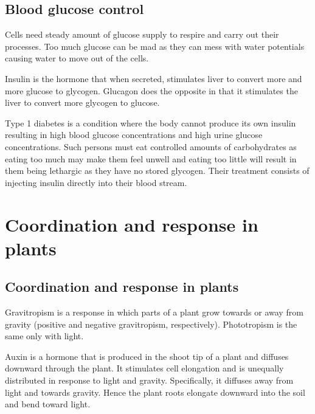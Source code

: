 \subsection{Blood glucose control}
Cells need steady amount of glucose supply to respire and carry out their processes. Too much 
glucose can be mad as they can mess with water potentials causing water to move out of the cells.

Insulin is the hormone that when secreted, stimulates liver to convert more and more glucose to
glycogen. Glucagon does the opposite in that it stimulates the liver to convert more glycogen to
glucose.

Type 1 diabetes is a condition where the body cannot produce its own insulin resulting in high
blood glucose concentrations and high urine glucose concentrations. Such persons must eat 
controlled amounts of carbohydrates as eating too much may make them feel unwell and eating too 
little will result in them being lethargic as they have no stored glycogen. Their treatment consists
of injecting insulin directly into their blood stream.

\section{Coordination and response in plants}
\subsection{Coordination and response in plants}
Gravitropism is a response in which parts of a plant grow towards or away from gravity (positive
and negative gravitropism, respectively). Phototropism is the same only with light.

Auxin is a hormone that is produced in the shoot tip of a plant and diffuses downward through the
plant. It stimulates cell elongation and is unequally distributed in response to light and gravity.
Specifically, it diffuses away from light and towards gravity. Hence the plant roots elongate downward
into the soil and bend toward light.
